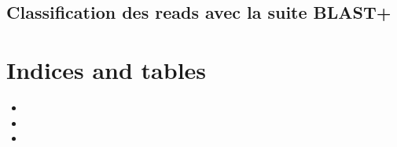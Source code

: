 \documentclass[letterpaper,10pt,french]{sphinxmanual}
\begin{document}
\subsection{Classification des reads avec la suite BLAST+}
\label{\detokenize{tutorial:classification-des-reads-avec-la-suite-blast}}\label{\detokenize{tutorial:classification-blast}}

\section{Indices and tables}
\label{\detokenize{index:indices-and-tables}}\begin{itemize}
\item {} 

\item {} 

\item {} 

\end{itemize}



\renewcommand{\indexname}{Index}
\printindex
\end{document}
